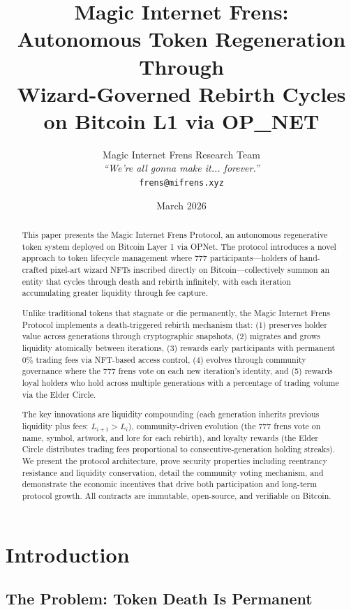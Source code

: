 \documentclass[11pt,a4paper]{article}
\title{\textbf{Magic Internet Frens:\\Autonomous Token Regeneration Through\\Wizard-Governed Rebirth Cycles\\on Bitcoin L1 via OP\_NET}}
\author{
    Magic Internet Frens Research Team\\
    \textit{``We're all gonna make it... forever.''}\\
    \texttt{frens@mifrens.xyz}
}
\date{March 2026}
\begin{document}
\maketitle

\begin{abstract}
This paper presents the Magic Internet Frens Protocol, an autonomous regenerative token system deployed on Bitcoin Layer 1 via OPNet. The protocol introduces a novel approach to token lifecycle management where 777 participants---holders of hand-crafted pixel-art wizard NFTs inscribed directly on Bitcoin---collectively summon an entity that cycles through death and rebirth infinitely, with each iteration accumulating greater liquidity through fee capture.

Unlike traditional tokens that stagnate or die permanently, the Magic Internet Frens Protocol implements a death-triggered rebirth mechanism that: (1) preserves holder value across generations through cryptographic snapshots, (2) migrates and grows liquidity atomically between iterations, (3) rewards early participants with permanent 0\% trading fees via NFT-based access control, (4) evolves through community governance where the 777 frens vote on each new iteration's identity, and (5) rewards loyal holders who hold across multiple generations with a percentage of trading volume via the Elder Circle.

The key innovations are liquidity compounding (each generation inherits previous liquidity plus fees: $L_{i+1} > L_i$), community-driven evolution (the 777 frens vote on name, symbol, artwork, and lore for each rebirth), and loyalty rewards (the Elder Circle distributes trading fees proportional to consecutive-generation holding streaks). We present the protocol architecture, prove security properties including reentrancy resistance and liquidity conservation, detail the community voting mechanism, and demonstrate the economic incentives that drive both participation and long-term protocol growth. All contracts are immutable, open-source, and verifiable on Bitcoin.
\end{abstract}

\section{Introduction}

\subsection{The Problem: Token Death Is Permanent}
\end{document}
